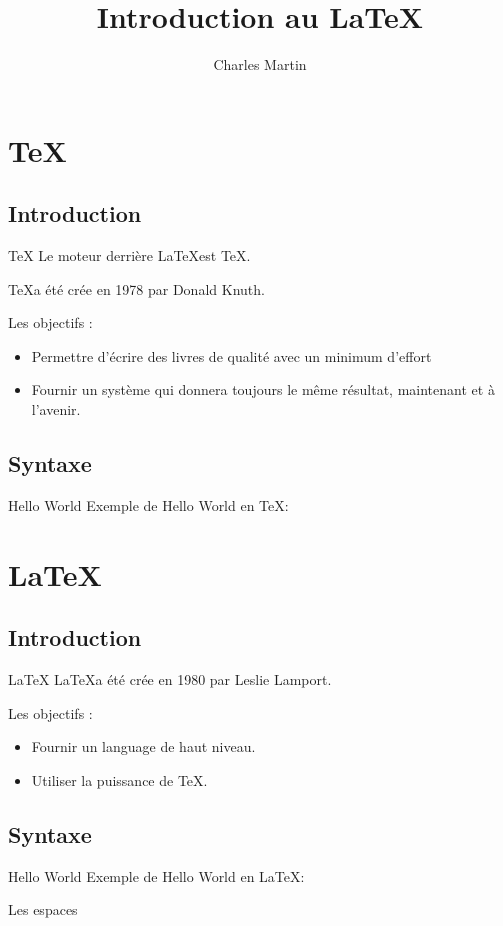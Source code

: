 \documentclass{beamer}
\title{Introduction au \LaTeX}
\author{Charles Martin}
\begin{document}
\frame{\titlepage}


\section{\TeX}	
\subsection{Introduction}
\begin{frame}{\TeX}
  Le moteur derrière \LaTeX est \TeX .
  
  \TeX a été crée en 1978 par Donald Knuth.
  \begin{block}{Les objectifs :}    
   \begin{itemize}
    \item Permettre d’écrire des livres de qualité avec un minimum d’effort
    \item Fournir un système qui donnera toujours le même résultat, maintenant et à l’avenir.
   \end{itemize}
  \end{block}
\end{frame}

\subsection{Syntaxe}
\begin{frame}{Hello World}
	Exemple de Hello World en \TeX :
    
\end{frame}

\section{\LaTeX}
\subsection{Introduction}
\begin{frame}{\LaTeX}
  \LaTeX a été crée en 1980 par Leslie Lamport.
  \begin{block}{Les objectifs :}    
   \begin{itemize}
    \item Fournir un language de haut niveau.
    \item Utiliser la puissance de TeX.
   \end{itemize}
  \end{block}
\end{frame}

\subsection{Syntaxe}

\begin{frame}{Hello World}
	Exemple de Hello World en \LaTeX :
    
\end{frame}


\begin{frame}{Les espaces}
\end{frame}
\end{document}
